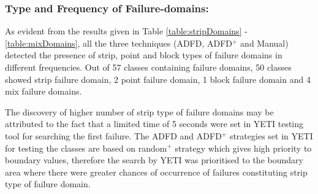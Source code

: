 



\subsubsection{Type and Frequency of Failure-domains:}
As evident from the results given in Table \ref{table:stripDomains} - \ref{table:mixDomains}, all the three techniques (ADFD, ADFD$^+$ and Manual) detected the presence of strip, point and block types of failure domains in different frequencies. Out of 57 classes containing failure domains, 50 classes showed strip failure domain, 2 point failure domain, 1 block failure domain and 4 mix failure domains.  

The discovery of higher number of strip type of failure domains may be attributed to the fact that a limited time of 5 seconds were set in YETI testing tool for searching the first failure. The ADFD and ADFD$^+$ strategies set in YETI for testing the classes are based on random$^+$ strategy which gives high priority to boundary values, therefore the search by YETI was prioritised to the boundary area where there were greater chances of occurrence of failures constituting strip type of failure domain.



